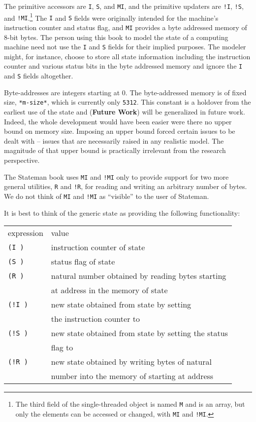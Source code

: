 \documentclass[submission,copyright,creativecommons]{eptcs}
\newcommand{\ptt}[1]{\tt{#1}}
\begin{document}
The primitive accessors are {\ptt{I}}, {\ptt{S}}, and {\ptt{MI}}, and the
primitive updaters are {\ptt{!I}}, {\ptt{!S}}, and {\ptt{!MI}}.\footnote{The third field of
the single-threaded object is named {\ptt{M}} and is an array, but only the elements can be
accessed or changed, with {\ptt{MI}} and {\ptt{!MI}}.}   The
{\ptt{I}} and {\ptt{S}} fields were originally intended for the machine's
instruction counter and status flag, and {\ptt{MI}} provides a byte addressed
memory of 8-bit bytes.  The person using this book to model the state of a
computing machine need not use the {\ptt{I}} and {\ptt{S}} fields for their
implied purposes.  The modeler might, for instance, choose to store all state
information including the instruction counter and various status bits in the
byte addressed memory and ignore the {\ptt{I}} and {\ptt{S}} fields
altogether.

Byte-addresses are integers starting at 0.  The byte-addressed memory is of
fixed size, {\ptt{*m-size*}}, which is currently only {\ptt{5312}}.  This
constant is a holdover from the earliest use of the state and ({\bf{Future
    Work}}) will be generalized in future work.  Indeed, the whole
development would have been easier were there no upper bound on memory size.  Imposing
an upper bound forced certain issues to be dealt with -- issues that are necessarily raised in
any realistic model.  The magnitude of that upper bound is practically irrelevant from
the research perspective.

The Stateman book uses {\ptt{MI}} and {\ptt{!MI}} only to provide support for
two more general utilities, {\ptt{R}} and {\ptt{!R}}, for reading and writing
an arbitrary number of bytes.  We do not think of {\ptt{MI}} and {\ptt{!MI}}
as ``visible'' to the user of Stateman.

It is best to think of the generic state as providing the following
functionality:

\begin{tabular}{ll}
expression &  value \\
{\ptt{(I )}} &       instruction counter of state \\
{\ptt{(S )}} &      status flag of state \\
{\ptt{(R   )}} & natural number obtained by reading  bytes starting\\
                           & at address  in the memory of state \\
{\ptt{(!I  )}} &    new state obtained from state  by setting\\
                      &    the instruction counter to \\
{\ptt{(!S  )}} &    new state obtained from state  by setting the status\\
                      &    flag to \\
{\ptt{(!R    )}} & new state obtained by writing  bytes of natural\\
                      & number  into the memory of  starting at address \\
\end{tabular}
\end{document}
